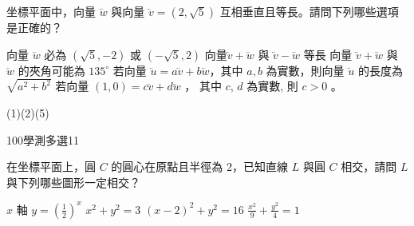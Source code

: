 \begin{QUESTIONS}
\begin{QUESTION}
\begin{ExamAnsRateInfo}{37}{64}{33}{14}
        \end{ExamAnsRateInfo}
        \begin{QBODY}
			坐標平面中，向量 $\lvec{w}$ 與向量 $\lvec{v} = (2,\sqrt{5})$ 互相垂直且等長。請問下列哪些選項是正確的？
			\begin{QOPS} 
				\QOP 向量 $\lvec{w}$ 必為 $(\sqrt{5},-2)$ 或 $(-\sqrt{5},2)$ 
				\QOP 向量$\lvec{v}+\lvec{w}$ 與 $\lvec{v}-\lvec{w}$ 等長 
				\QOP 向量 $\lvec{v}+\lvec{w}$ 與 $\lvec{w}$ 的夾角可能為 $135^\circ$ 
				\QOP 若向量 $\lvec{u}=a \lvec{v}+b \lvec{w}$，其中 $a,b$ 為實數，則向量 $\lvec{u}$ 的長度為 $\sqrt{a^2 +b^2}$ 
				\QOP 若向量 $(1,0)=c\lvec{v}+d \lvec{w}$ ， 其中 $c$, $d$ 為實數, 則 $c>0$ 。
			\end{QOPS}
        \end{QBODY}
        \begin{QFROMS}
        \end{QFROMS}
        \begin{QTAGS}\end{QTAGS}
        \begin{QANS}
            (1)(2)(5)
        \end{QANS}
        \begin{QSOLLIST}
        \end{QSOLLIST}
        \begin{QEMPTYSPACE}
        \end{QEMPTYSPACE}
    \end{QUESTION}
    \begin{QUESTION}
        \begin{ExamInfo}{100}{學測}{多選}{11}
        \end{ExamInfo}
        \begin{ExamAnsRateInfo}{47}{76}{46}{19}
        \end{ExamAnsRateInfo}
        \begin{QBODY}
			在坐標平面上，圓 $C$ 的圓心在原點且半徑為 2，已知直線 $L$ 與圓 $C$ 相交，請問 $L$ 與下列哪些圖形一定相交？ 
			\begin{QOPS}
				\QOP $x$ 軸 
				\QOP $y = (\frac{1}{2})^x$    
				\QOP  $x^2 +y^2 =3$    \QOP $(x-2)^2 +y^2 =16$ 
				\QOP $\frac{x^2}{9} +\frac{y^2}{4} =1$
			\end{QOPS}
        \end{QBODY}
        \begin{QFROMS}
        \end{QFROMS}
        \begin{QTAGS}\end{QTAGS}

\end{QUESTION}
\end{QUESTIONS}
